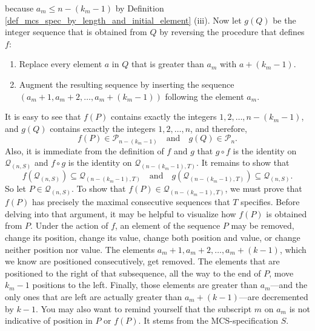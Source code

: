 \documentclass{article}
\begin{document}
because $a_m \leq n-(k_m-1)$ by Definition \ref{def_mcs_spec_by_length_and_initial_element} (iii).
Now let $g(Q)$ be the integer sequence that
is obtained from $Q$ by reversing the procedure that defines $f$:
\begin{enumerate}
\item
 Replace every element $a$ in $Q$ that is greater than $a_m$ with $a+(k_m-1)$.
\item
  Augment the resulting sequence by inserting the sequence $(a_m + 1, a_m+2, \ldots, a_m+(k_m-1))$
  following the element $a_m$.
\end{enumerate}
It is easy to see that $f(P)$ contains exactly the integers $1, 2, \ldots, n-(k_m-1)$, and $g(Q)$ contains
exactly the integers $1, 2, \ldots, n$, and therefore,
$$
f(P)\in {\mathcal P}_{n-(k_m-1)}
\quad\text{and}\quad
g(Q)\in {\mathcal P}_n.
$$
Also, it is immediate from the definition of $f$ and $g$ that $g\circ f$ is the
identity on ${\mathcal Q}_{(n,S)}$ and $f\circ g$ is the identity on ${\mathcal Q}_{(n-(k_m-1),T)}$.
It remains to show that
$$
f({\mathcal Q}_{(n,S)}) \subseteq {\mathcal Q}_{(n-(k_m-1),T)}
\quad \text{and}\quad
g({\mathcal Q}_{(n-(k_m-1),T)}) \subseteq {\mathcal Q}_{(n,S)}.
$$
So let $P\in {\mathcal Q}_{(n,S)}$. To show that $f(P)\in {\mathcal Q}_{(n-(k_m-1),T)}$, we must prove
that $f(P)$ has precisely the maximal consecutive sequences that $T$ specifies. Before delving into that argument,
it may be helpful to visualize how $f(P)$ is obtained from $P$. Under the action of $f$, an element of the
sequence $P$ may be removed, change its position, change its value, change both position and value,
or change neither position nor value. The elements $a_m + 1, a_m + 2, \ldots, a_m + (k -1)$, which we know
are positioned consecutively, get removed. The elements that are positioned to the right of that subsequence,
all the way to the end of $P$, move $k_m - 1$ positions to the left. Finally, those elements are greater than
$a_m$---and the only ones that are left are actually greater than $a_m + (k -1)$---are decremented by $k-1$.
You may also want to remind yourself that the subscript $m$ on $a_m$ is not indicative of position in
$P$ or $f(P)$. It stems from the MCS-specification $S$.
\end{document}
